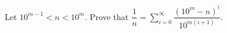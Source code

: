Let $10^{m-1}<n<10^m$. Prove that $\dfrac1n=\displaystyle\sum_{i=0}^\infty\dfrac{(10^m-n)^i}{10^{m(i+1)}}$.
